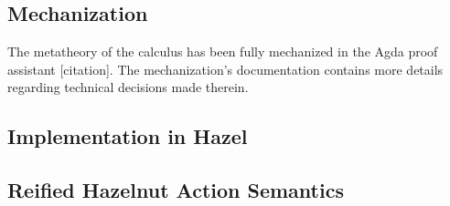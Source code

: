 





\subsection{Mechanization}
\label{sec:calculus-agda}

The metatheory of the calculus has been fully mechanized in the Agda proof assistant [citation]. The
mechanization's documentation contains more details regarding technical decisions made therein.

\subsection{Implementation in Hazel}

\subsection{Reified Hazelnut Action Semantics}

